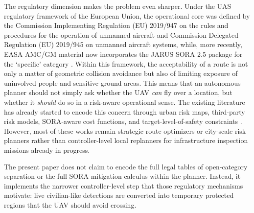 \documentclass[a4paper,11pt]{article}
\begin{document}
The regulatory dimension makes the problem even sharper. Under the UAS regulatory framework of the European Union, the operational core was defined by the Commission Implementing Regulation (EU) 2019/947 on the rules and procedures for the operation of unmanned aircraft and Commission Delegated Regulation (EU) 2019/945 on unmanned aircraft systems, while, more recently, EASA AMC/GM material now incorporates the JARUS SORA 2.5 package for the `specific' category \cite{EU2019_947,EU2019_945,JARUS_SORA_2_5_2024,EASA_AMC_GM_SORA25_2025}. Within this framework, the acceptability of a route is not only a matter of geometric collision avoidance but also of limiting exposure of uninvolved people and sensitive ground areas. This means that an autonomous planner should not simply ask whether the UAV \emph{can} fly over a location, but whether it \emph{should} do so in a risk-aware operational sense. The existing literature has already started to encode this concern through urban risk maps, third-party risk models, SORA-aware cost functions, and target-level-of-safety constraints \cite{primatesta2019riskaware,primatesta2020groundrisk,pang2022integrated,tang2023thirdparty,zhang2023groundrisk,heinze2023sora,brassel2025riskaware}. However, most of these works remain strategic route optimizers or city-scale risk planners rather than controller-level local replanners for infrastructure inspection missions already in progress.

 The present paper does not claim to encode the full legal tables of open-category separation or the full SORA mitigation calculus within the planner. Instead, it implements the narrower controller-level step that those regulatory mechanisms motivate: live civilian-like detections are converted into temporary protected regions that the UAV should avoid crossing.

\end{document}

